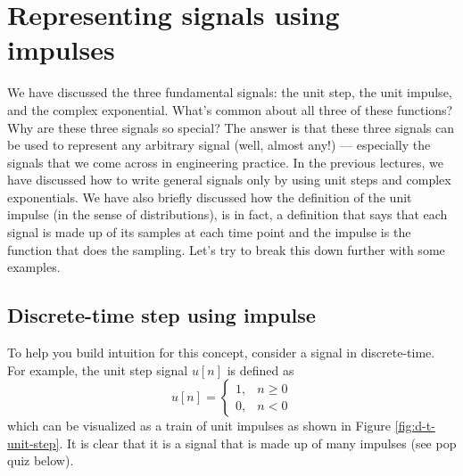\section{Representing signals using impulses}
We have discussed the three fundamental signals: the unit step, the unit impulse, and the complex exponential. What's common about all three of these functions? Why are these three signals so special? The answer is that these three signals can be used to represent any arbitrary signal (well, almost any!) --- especially the signals that we come across in engineering practice. In the previous lectures, we have discussed how to write general signals only by using unit steps and complex exponentials. We have also briefly discussed how the definition of the unit impulse (in the sense of distributions), is in fact, a definition that says that each signal is made up of its samples at each time point and the impulse is the function that does the sampling. Let's try to break this down further with some examples. 

\subsection{Discrete-time step using impulse}
To help you build intuition for this concept, consider a signal in discrete-time. For example, the unit step signal $u[n]$ is defined as
\[
u[n] = \begin{cases}
1, & n \geq 0 \\
0, & n < 0
\end{cases}
\]
which can be visualized as a train of unit impulses as shown in Figure \ref{fig:d-t-unit-step}. It is clear that it is a signal that is made up of many impulses (see pop quiz below).


